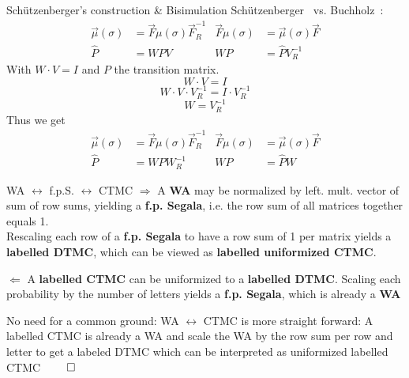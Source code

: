 \documentclass[rgb, pdf]{beamer}
\begin{document}
    \begin{frame}[allowframebreaks]{Schützenberger's construction \& Bisimulation}
       Schützenberger~\autocite{schutz} vs. Buchholz~\autocite{buchholz2008bisimulation}: 
        \begin{align}
         \overrightarrow{\mu}(\sigma) & = \overrightarrow{F} \mu(\sigma) \overrightarrow{F}^{-1}_R 
         & \overrightarrow{F} \mu(\sigma) & = \overrightarrow{\mu}(\sigma)\overrightarrow{F} \\
       \hat{P} & = W P V & W P & = \hat{P} V_R^{-1} 
        \end{align}   With $W \cdot V = I$ and $P$ the transition matrix. \\
        \vspace{0.7cm}
        \[ W \cdot V = I \]
        \[ W \cdot V \cdot V^{-1}_R = I \cdot V^{-1}_R \]
        \[ W = V^{-1}_R \]
        Thus we get 
        \begin{align}
         \overrightarrow{\mu}(\sigma) & = \overrightarrow{F} \mu(\sigma) \overrightarrow{F}^{-1}_R 
         & \overrightarrow{F} \mu(\sigma) & = \overrightarrow{\mu}(\sigma)\overrightarrow{F} \\
       \hat{P} & = W P W^{-1}_R & W P & = \hat{P} W
        \end{align}
        \end{frame}
        
        \begin{frame}{WA $\leftrightarrow$ f.p.S. $\leftrightarrow$ CTMC}
        $\Rightarrow$
         A \textbf{WA} may be normalized by left. mult. vector of sum of row sums, yielding a \textbf{f.p. Segala}, i.e. the row sum of all matrices together equals 1. \\ 
         Rescaling each row of a \textbf{f.p. Segala} to have a row sum of 1 per matrix yields a \textbf{labelled DTMC}, which can be viewed as \textbf{labelled uniformized CTMC}. \\ \vspace{1.4cm}
         
         $\Leftarrow$
         A \textbf{labelled CTMC} can be uniformized to a \textbf{labelled DTMC}. Scaling each probability by the number of letters yields a \textbf{f.p. Segala}, which is already a \textbf{WA}\\ \vspace{1.4cm}
         
         No need for a common ground: WA $\leftrightarrow$ CTMC is more straight forward: A labelled CTMC is already a WA and scale the WA by the row sum per row and letter to get a labeled DTMC which can be interpreted as uniformized labelled CTMC \hfill $\qed$
         
        \end{frame}
\end{document}
